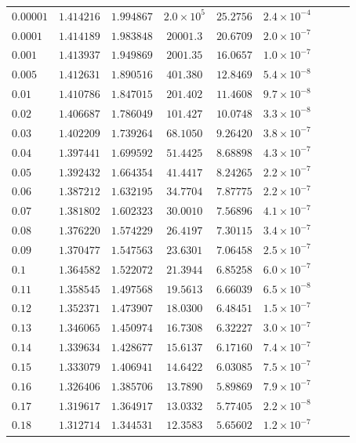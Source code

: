 \documentclass[12pt]{extarticle}
\theoremstyle{plain}
\theoremstyle{remark}
\begin{document}
\begin{longtable}{lcccccccc}
$0.00001$ & $1.414216$ & $1.994867$ & $2.0\times10^{5}$ & $25.2756$ & $2.4\times10^{-4}$ \\
$0.0001$ & $1.414189$ & $1.983848$ & $20001.3$ & $20.6709$ & $2.0\times10^{-7}$ \\
$0.001$ & $1.413937$ & $1.949869$ & $2001.35$ & $16.0657$ & $1.0\times10^{-7}$ \\
$0.005$ & $1.412631$ & $1.890516$ & $401.380$ & $12.8469$ & $5.4\times10^{-8}$ \\
$0.01$ & $1.410786$ & $1.847015$ & $201.402$ & $11.4608$ & $9.7\times10^{-8}$ \\
$0.02$ & $1.406687$ & $1.786049$ & $101.427$ & $10.0748$ & $3.3\times10^{-8}$ \\
$0.03$ & $1.402209$ & $1.739264$ & $68.1050$ & $9.26420$ & $3.8\times10^{-7}$ \\
$0.04$ & $1.397441$ & $1.699592$ & $51.4425$ & $8.68898$ & $4.3\times10^{-7}$ \\
$0.05$ & $1.392432$ & $1.664354$ & $41.4417$ & $8.24265$ & $2.2\times10^{-7}$ \\
$0.06$ & $1.387212$ & $1.632195$ & $34.7704$ & $7.87775$ & $2.2\times10^{-7}$ \\
$0.07$ & $1.381802$ & $1.602323$ & $30.0010$ & $7.56896$ & $4.1\times10^{-7}$ \\
$0.08$ & $1.376220$ & $1.574229$ & $26.4197$ & $7.30115$ & $3.4\times10^{-7}$ \\
$0.09$ & $1.370477$ & $1.547563$ & $23.6301$ & $7.06458$ & $2.5\times10^{-7}$ \\
$0.1$ & $1.364582$ & $1.522072$ & $21.3944$ & $6.85258$ & $6.0\times10^{-7}$ \\
$0.11$ & $1.358545$ & $1.497568$ & $19.5613$ & $6.66039$ & $6.5\times10^{-8}$ \\
$0.12$ & $1.352371$ & $1.473907$ & $18.0300$ & $6.48451$ & $1.5\times10^{-7}$ \\
$0.13$ & $1.346065$ & $1.450974$ & $16.7308$ & $6.32227$ & $3.0\times10^{-7}$ \\
$0.14$ & $1.339634$ & $1.428677$ & $15.6137$ & $6.17160$ & $7.4\times10^{-7}$ \\
$0.15$ & $1.333079$ & $1.406941$ & $14.6422$ & $6.03085$ & $7.5\times10^{-7}$ \\
$0.16$ & $1.326406$ & $1.385706$ & $13.7890$ & $5.89869$ & $7.9\times10^{-7}$ \\
$0.17$ & $1.319617$ & $1.364917$ & $13.0332$ & $5.77405$ & $2.2\times10^{-8}$ \\
$0.18$ & $1.312714$ & $1.344531$ & $12.3583$ & $5.65602$ & $1.2\times10^{-7}$ \\

\end{longtable}
\end{document}
